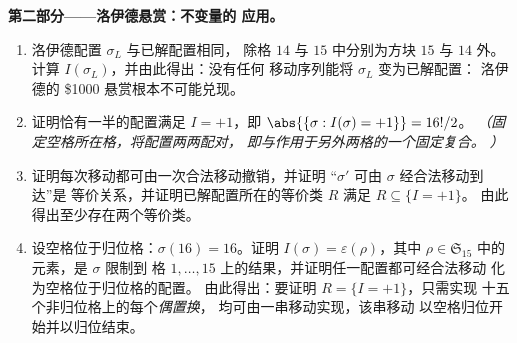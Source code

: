 \begin{problem}
\medskip
\noindent\textbf{第二部分——洛伊德悬赏：不变量的
应用。}
\begin{enumerate}[resume]
  \item 洛伊德配置 $\sigma_L$ 与已解配置相同，
        除格 $14$ 与 $15$ 中分别为方块 $15$ 与 $14$ 外。
        计算 $I(\sigma_L)$，并由此得出：没有任何
        移动序列能将 $\sigma_L$ 变为已解配置：
        洛伊德的 \$1000 悬赏根本不可能兑现。
  \item 证明恰有一半的配置满足 $I =
        +1$，即 $\abs{\{\sigma : I(\sigma) = +1\}} = 16!/2$。
        \emph{（固定空格所在格，将配置两两配对，
        即与作用于另外两格的一个固定复合。
        ）}
  \item 证明每次移动都可由一次合法移动撤销，并证明
        “$\sigma'$ 可由 $\sigma$ 经合法移动到达”是
        等价关系，并证明已解配置所在的等价类 $R$
        满足 $R \subseteq \{I = +1\}$。
        由此得出至少存在两个等价类。
  \item 设空格位于归位格：$\sigma(16) = 16$。证明
        $I(\sigma) = \varepsilon(\rho)$，其中 $\rho \in
        \mathfrak{S}_{15}$ 中的元素，是 $\sigma$ 限制到
        格 $1, \dots, 15$ 上的结果，并证明任一配置都可经合法移动
        化为空格位于归位格的配置。
        由此得出：要证明 $R = \{I = +1\}$，只需实现
        十五个非归位格上的每个\emph{偶置换}，
        均可由一串移动实现，该串移动
        以空格归位开始并以归位结束。
\end{enumerate}


\end{problem}
